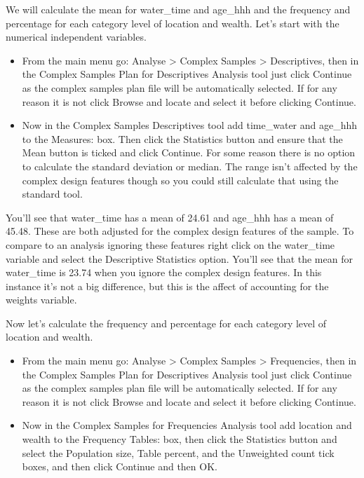 \documentclass[
]{book}
\begin{document}
We will calculate the mean for water\_time and age\_hhh and the frequency and percentage for each category level of location and wealth. Let's start with the numerical independent variables.

\begin{itemize}
\item
  From the main menu go: Analyse \textgreater{} Complex Samples \textgreater{} Descriptives, then in the Complex Samples Plan for Descriptives Analysis tool just click Continue as the complex samples plan file will be automatically selected. If for any reason it is not click Browse and locate and select it before clicking Continue.
\item
  Now in the Complex Samples Descriptives tool add time\_water and age\_hhh to the Measures: box. Then click the Statistics button and ensure that the Mean button is ticked and click Continue. For some reason there is no option to calculate the standard deviation or median. The range isn't affected by the complex design features though so you could still calculate that using the standard tool.
\end{itemize}

You'll see that water\_time has a mean of 24.61 and age\_hhh has a mean of 45.48. These are both adjusted for the complex design features of the sample. To compare to an analysis ignoring these features right click on the water\_time variable and select the Descriptive Statistics option. You'll see that the mean for water\_time is 23.74 when you ignore the complex design features. In this instance it's not a big difference, but this is the affect of accounting for the weights variable.

Now let's calculate the frequency and percentage for each category level of location and wealth.

\begin{itemize}
\item
  From the main menu go: Analyse \textgreater{} Complex Samples \textgreater{} Frequencies, then in the Complex Samples Plan for Descriptives Analysis tool just click Continue as the complex samples plan file will be automatically selected. If for any reason it is not click Browse and locate and select it before clicking Continue.
\item
  Now in the Complex Samples for Frequencies Analysis tool add location and wealth to the Frequency Tables: box, then click the Statistics button and select the Population size, Table percent, and the Unweighted count tick boxes, and then click Continue and then OK.
\end{itemize}
\end{document}
